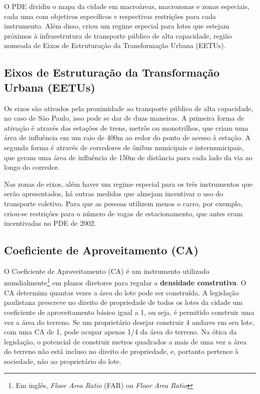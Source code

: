 O PDE dividiu o mapa da cidade em macroáreas, macrozonas e zonas especiais, cada uma com objetivos específicos e respectivas restrições para cada instrumento. Além disso, criou um regime especial para lotes que estejam próximos à infraestrutura de transporte público de alta capacidade, região nomeada de Eixos de Estruturação da Transformação Urbana (EETUs). 

\subsection*{Eixos de Estruturação da Transformação Urbana (EETUs)}

Os eixos são ativados pela proximidade ao transporte público de alta capacidade, no caso de São Paulo, isso pode se dar de duas maneiras. A primeira forma de ativação é através das estações de trens, metrôs ou monotrilhos, que criam uma área de influência em um raio de 400m ao redor do ponto de acesso à estação. A segunda forma é através de corredores de ônibus municipais e intermunicipais, que geram uma área de influência de 150m de distância para cada lado da via ao longo do corredor.

Nas zonas de eixos, além haver um regime especial para os três instrumentos que serão apresentados, há outras medidas que almejam incentivar o uso do transporte coletivo. Para que as pessoas utilizem menos o carro, por exemplo, criou-se restrições para o número de vagas de estacionamento, que antes eram incentivadas no PDE de 2002.

\subsection*{Coeficiente de Aproveitamento (CA)}

O Coeficiente de Aproveitamento (CA) é um instrumento utilizado mundialmente\footnote{Em inglês, \textit{Floor Area Ratio} (FAR) ou \textit{Floor Area Ratio}} em planos diretores para regular a \textbf{densidade construtiva}. O CA determina quantas vezes a área do lote pode ser construída. A legislação paulistana prescreve no direito de propriedade de todos os lotes da cidade um coeficiente de aproveitamento básico igual a 1, ou seja, é permitido construir uma vez a área do terreno. Se um proprietário desejar construir 4 andares em seu lote, com uma CA de 1, pode ocupar apenas 1/4 da área do terreno. Na ótica da legislação, o potencial de construir metros quadrados a mais de uma vez a área do terreno não está incluso no direito de propriedade, e, portanto pertence à sociedade, não ao proprietário do lote.

